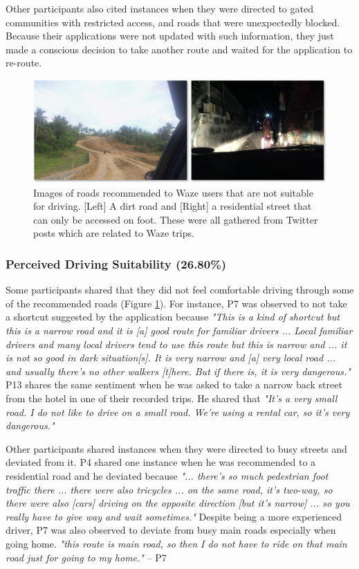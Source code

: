 Other participants also cited instances when they were directed to gated communities with restricted access, and roads that were unexpectedly blocked. Because their applications were not updated with such information, they just made a conscious decision to take another route and waited for the application to re-route. 

\begin{figure}[t]
  \centering
  \includegraphics[scale=0.6]{figures/s1-driving-suitability.png}
  \caption{Images of roads recommended to Waze users that are not suitable for driving. [Left] A dirt road and [Right] a residential street that can only be accessed on foot. These were all gathered from Twitter posts which are related to Waze trips.}
  \label{fig:s1-driving-suitability}
\end{figure}

\subsubsection{Perceived Driving Suitability (26.80\%)}
Some participants shared that they did not feel comfortable driving through some of the recommended roads (Figure \ref{fig:s1-driving-suitability}). For instance, P7 was observed to not take a shortcut suggested by the application because \emph{"This is a kind of shortcut but this is a narrow road and it is [a] good route for familiar drivers ... Local familiar drivers and many local drivers tend to use this route but this is narrow and ... it is not so good in dark situation[s]. It is very narrow and [a] very local road ... and usually there's no other walkers [t]here. But if there is, it is very dangerous."} P13 shares the same sentiment when he was asked to take a narrow back street from the hotel in one of their recorded trips. He shared that \emph{"It's a very small road. I do not like to drive on a small road. We're using a rental car, so it's very dangerous."}

Other participants shared instances when they were directed to busy streets and deviated from it. P4 shared one instance when he was recommended to a residential road and he deviated because \emph{"... there's so much pedestrian foot traffic there ... there were also tricycles ... on the same road, it's two-way, so there were also [cars] driving on the opposite direction [but it's narrow] ... so you really have to give way and wait sometimes."} Despite being a more experienced driver, P7 was also observed to deviate from busy main roads especially when going home. \emph{"this route is main road, so then I do not have to ride on that main road just for going to my home."} -- P7

